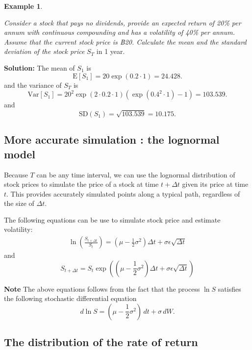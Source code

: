 \documentclass[
]{book}
\theoremstyle{definition}
\theoremstyle{definition}
\newtheorem{example}{Example}[chapter]
\theoremstyle{definition}
\theoremstyle{definition}
\theoremstyle{remark}
\begin{document}
\begin{example}
\protect\hypertarget{exm:unlabeled-div-81}{}\label{exm:unlabeled-div-81}

\emph{Consider a stock that pays no dividends, provide an expected return of
20\% per annum with continuous compounding and has a volatility of 40\%
per annum. Assume that the current stock price is ฿20. Calculate the
mean and the standard deviation of the stock price} \(S_T\) in 1 year.

\end{example}

\textbf{Solution:} The mean of \(S_1\) is
\[\mathrm{E}[S_1] =  20 \exp (0.2 \cdot 1)  = 24.428.\] and the variance
of \(S_T\) is
\[\mathrm{Var}[S_1] = 20^2 \exp(2 \cdot 0.2 \cdot 1) (\exp(0.4^2 \cdot 1) - 1) = 103.539.\]
and \[\text{SD}(S_1) = \sqrt{ 103.539} = 10.175.\]

\hypertarget{more-accurate-simulation-the-lognormal-model}{%
\subsection{More accurate simulation : the lognormal model}\label{more-accurate-simulation-the-lognormal-model}}

Because \(T\) can be any time interval, we can use the lognormal
distribution of stock prices to simulate the price of a stock at time
\(t + \Delta t\) given its price at time \(t\). This provides accurately
simulated points along a typical path, regardless of the size of
\(\Delta t\).

The following equations can be use to simulate stock price and estimate
volatility: \[\begin{aligned}
 \label{lognormalModel}
\ln\left(  \frac{S_{t+\Delta t}}{S_t} \right) = (\mu - \frac{1}{2}\sigma^2 )\Delta t + \sigma \epsilon \sqrt{\Delta t}\end{aligned}\]
and
\[S_{t+ \Delta t}  = S_t \exp(   (\mu - \frac{1}{2}\sigma^2 )\Delta t + \sigma \epsilon \sqrt{\Delta t}  )\]

\textbf{Note} The above equations follows from the fact that the process
\(\ln S\) satisfies the following stochastic differential equation
\[d \ln S =  (\mu - \frac{1}{2}\sigma^2 ) \, dt + \sigma \, d W.\]

\hypertarget{the-distribution-of-the-rate-of-return}{%
\subsection{The distribution of the rate of return}\label{the-distribution-of-the-rate-of-return}}
\end{document}

